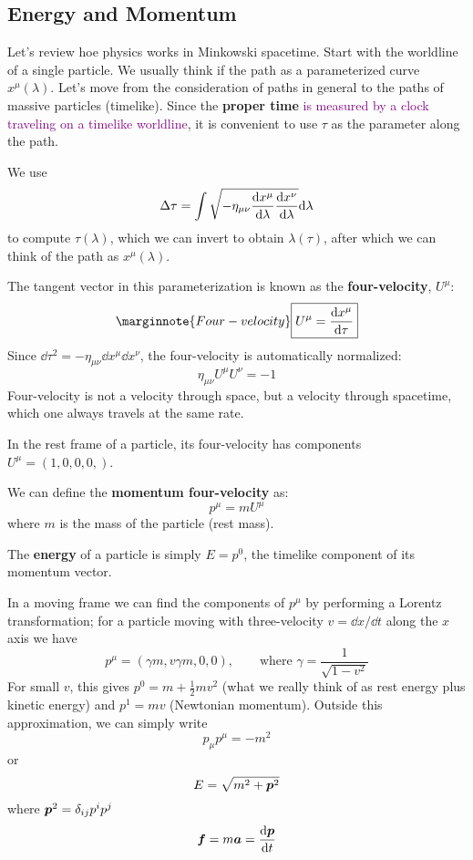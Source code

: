 \subsection{Energy and Momentum}
Let's review hoe physics works in Minkowski spacetime. Start with the worldline of a single particle. We usually think if the path as a parameterized curve $x^\mu(\lambda)$. Let's move from the consideration of paths in general to the paths of massive particles (timelike). Since the \textbf{proper time} \textcolor{purple}{is measured by a clock traveling on a timelike worldline}, it is convenient to use $\tau$ as the parameter along the path.

We use
\begin{equation*}
    \Delta\tau=\int\sqrt{-\eta_{\mu\nu}\dv{x^\mu}{\lambda}\dv{x^\nu}{\lambda}}\dd\lambda
\end{equation*}
to compute $\tau(\lambda)$, which we can invert to obtain $\lambda(\tau)$, after which we can think of the path as $x^\mu(\lambda)$.

The tangent vector in this parameterization is known as the \textbf{four-velocity}, $U^\mu$:
\begin{equation*}\marginnote{Four-velocity}
    \boxed{U^\mu=\dv{x^\mu}{\tau}}
\end{equation*}
Since $\dd\tau^2=-\eta_{\mu\nu}\dd x^\mu\dd x^\nu$, the four-velocity is automatically normalized:
\begin{equation*}
    \eta_{\mu\nu}U^\mu U^\nu=-1
\end{equation*}
Four-velocity is not a velocity through space, but a velocity through spacetime, which one always  travels at the same rate.

In the rest frame of a particle, its four-velocity has components $U^\mu=(1,0,0,0,)$.

We can define the \textbf{momentum four-velocity} as:
\begin{equation*}
    \boxed{p^\mu=mU^\mu}
\end{equation*}
where $m$ is the mass of the particle (rest mass).

The \textbf{energy} of a particle is simply $E=p^0$, the timelike component of its momentum vector.

In a moving frame we can find the components of $p^\mu$ by performing a Lorentz transformation; for a particle moving with three-velocity $v=\dd x/\dd t$ along the $x$ axis we have
\begin{equation*}
    p^\mu=(\gamma m,v\gamma m,0,0), \qquad \text{where $\gamma=\frac{1}{\sqrt{1-v^2}}$}
\end{equation*}
For small $v$, this gives $p^0=m+\frac{1}{2}mv^2$ (what we really think of as rest energy plus kinetic energy) and $p^1=mv$ (Newtonian momentum). Outside this approximation, we can simply write
\begin{equation*}
    p_\mu p^\mu=-m^2
\end{equation*}
or 
\begin{equation*}
    E=\sqrt{m^2+\vb*{p}^2}
\end{equation*}
where $\vb*{p}^2=\delta_{ij}p^{i}p^j$
\begin{equation*}
    \vb*{f}=m\vb*{a}=\dv{\vb*{p}}{t}
\end{equation*}

